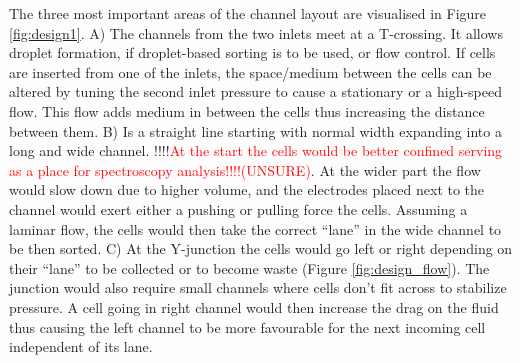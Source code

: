 \documentclass[draft]{jyflluk}
\begin{document}
The three most important areas of the channel layout are visualised in Figure \ref{fig:design1}. A) The channels from the two inlets meet at a T-crossing. It allows droplet formation, if droplet-based sorting is to be used, or flow control. If cells are inserted from one of the inlets, the space/medium between the cells can be altered by tuning the second inlet pressure to cause a stationary or a high-speed flow. This flow adds medium in between the cells thus increasing the distance between them. B) Is a straight line starting with normal width expanding into a long and wide channel. !!!!\textcolor{red}{At the start the cells would be better confined serving as a place for spectroscopy analysis!!!!(UNSURE)}. At the wider part the flow would slow down due to higher volume, and the electrodes placed next to the channel would exert either a pushing or pulling force the cells. Assuming a laminar flow, the cells would then take the correct “lane” in the wide channel to be then sorted. C) At the Y-junction the cells would go left or right depending on their “lane” to be collected or to become waste (Figure \ref{fig:design_flow}). The junction would also require small channels where cells don’t fit across to stabilize pressure. A cell going in right channel would then increase the drag on the fluid thus causing the left channel to be more favourable for the next incoming cell independent of its lane.
\end{document}
